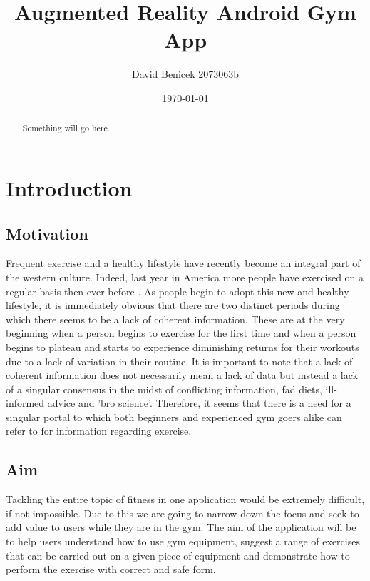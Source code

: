 \documentclass{l4proj}
\begin{document}
\title{Augmented Reality Android Gym App}
\author{David Benicek 2073063b}
\date{\today}
\maketitle

\begin{abstract}
Something will go here.
\end{abstract}

\educationalconsent
%
%
\tableofcontents

\chapter{Introduction}
\section{Motivation}
Frequent exercise and a healthy lifestyle have recently become an integral part of the western culture. Indeed, last year in America more people have exercised on a regular basis then ever before \cite{riffkin_so_2015}. As people begin to adopt this new and healthy lifestyle, it is immediately obvious that there are two distinct periods during which there seems to be a lack of coherent information. These are at the very beginning when a person begins to exercise for the first time and when a person begins to plateau and starts to experience diminishing returns for their workouts due to a lack of variation in their routine. It is important to note that a lack of coherent information does not necessarily mean a lack of data but instead a lack of a singular consensus in the midst of conflicting information, fad diets, ill-informed advice and 'bro science'. Therefore, it seems that there is a need for a singular portal to which both beginners and experienced gym goers alike can refer to for information regarding exercise.  

\section{Aim} \label{sec:aim}
Tackling the entire topic of fitness in one application would be extremely difficult, if not impossible. Due to this we are going to narrow down the focus and seek to add value to users while they are in the gym. The aim of the application will be to help users understand how to use gym equipment, suggest a range of exercises that can be carried out on a given piece of equipment and demonstrate how to perform the exercise with correct and safe form. 
\end{document}
